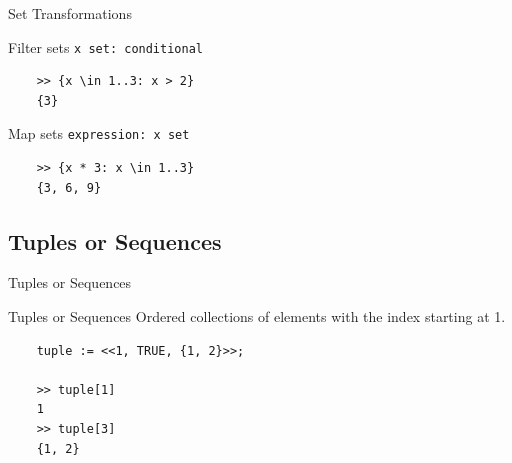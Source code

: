 \documentclass[10pt]{beamer}
\begin{document}
\begin{frame}[fragile]{Set Transformations}
  \begin{exampleblock}{Filter sets}
    \texttt{{x \in set: conditional}}
  \end{exampleblock}

  \begin{verbatim}
    >> {x \in 1..3: x > 2}
    {3}
  \end{verbatim}

  \begin{exampleblock}{Map sets}
    \texttt{{expression: x \in set}}
  \end{exampleblock}

  \begin{verbatim}
    >> {x * 3: x \in 1..3}
    {3, 6, 9}
  \end{verbatim}
  
\end{frame}

\subsection{Tuples or Sequences}

\begin{frame}[fragile]{Tuples or Sequences}
  \begin{exampleblock}{Tuples or Sequences}
    \alert{Ordered} collections of elements with the \alert{index starting at 1}.
  \end{exampleblock}

  \begin{verbatim}
    tuple := <<1, TRUE, {1, 2}>>;
    
    >> tuple[1]
    1
    >> tuple[3]
    {1, 2}
  \end{verbatim}
\end{frame}
\end{document}
